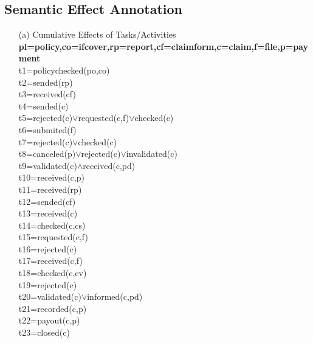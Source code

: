 \documentclass[runningheads]{llncs}
\begin{document}
\subsection{Semantic Effect Annotation}

\begin{itemize}
\item[(a)]{Cumulative Effects of Tasks/Activities} \\
\textbf{pl=policy,co=ifcover,rp=report,cf=claimform,c=claim,f=file,p=payment}\\
t1=policychecked(po,co) \\
t2=sended(rp)\\
t3=received(cf)\\
t4=sended(c)\\
t5=rejected(c)$\vee$requested(c,f)$\vee$checked(c)\\
t6=submited(f)\\
t7=rejected(c)$\vee$checked(c)\\
t8=canceled(p)$\vee$rejected(c)$\vee$invalidated(c)\\
t9=validated(c)$\wedge$received(c,pd)\\                
t10=received(c,p)\\
t11=received(rp)\\
t12=sended(cf)\\
t13=received(c)\\
t14=checked(c,cs)\\
t15=requested(c,f)\\
t16=rejected(c)\\
t17=received(c,f)\\
t18=checked(c,cv)\\
t19=rejected(c)\\
t20=validated(c)$\vee$informed(c,pd)\\
t21=recorded(c,p)\\
t22=payout(c,p)\\
t23=closed(c)\\


\end{itemize}
\end{document}
